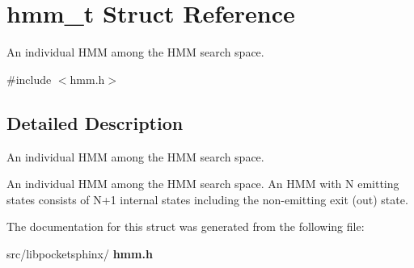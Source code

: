 \section{hmm\+\_\+t Struct Reference}
\label{structhmm__t}


An individual H\+MM among the H\+MM search space.  




{\ttfamily \#include $<$hmm.\+h$>$}



\subsection{Detailed Description}
An individual H\+MM among the H\+MM search space. 

An individual H\+MM among the H\+MM search space. An H\+MM with N emitting states consists of N+1 internal states including the non-\/emitting exit (out) state. 

The documentation for this struct was generated from the following file\+:\begin{DoxyCompactItemize}
\item 
src/libpocketsphinx/\textbf{ hmm.\+h}\end{DoxyCompactItemize}
